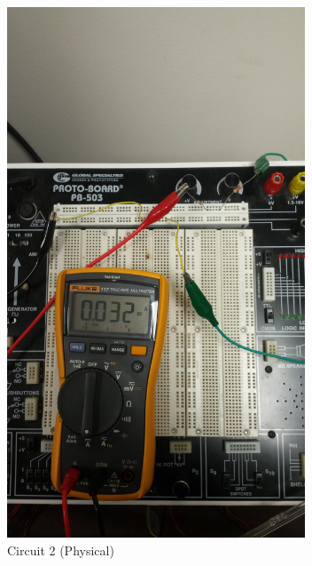 \documentclass[12pt]{article}
\begin{document}
\begin{figure}[h!] %
   \centering
   \includegraphics[width=3.5in,angle=-90]{Circuit_2_real.jpg} 
   \caption{Circuit 2 (Physical)}
   \label{fig:example}
\end{figure}
\end{document}
